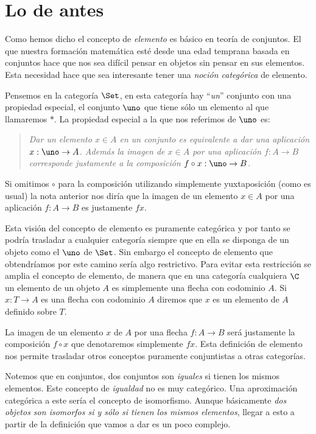 \section{Lo de antes}
Como hemos dicho el concepto de \emph{elemento} es básico en teoría de conjuntos. El que nuestra formación matemática esté desde una edad temprana basada en conjuntos hace que nos sea difícil pensar en objetos sin pensar en sus elementos. Esta necesidad hace que sea interesante tener una \emph{noción categórica} de elemento.

Pensemos en la categoría $\Set$, en esta categoría hay ``\emph{un}'' conjunto con una propiedad especial, el conjunto $\uno$  que tiene sólo un elemento al que llamaremos $*$. La propiedad especial a la que nos referimos de $\uno$ es:
\begin{quotation}
	\emph{Dar un elemento $x\in A$ en un conjunto es equivalente a dar una aplicación $x:\uno\rightarrow A$. Además la imagen de $x\in A$ por una aplicación $f:A\rightarrow B$ corresponde justamente a la composición $f\circ x:\uno \rightarrow B$.}
\end{quotation}

Si omitimos $\circ$ para la composición utilizando simplemente yuxtaposición (como es usual) la nota anterior nos diría que la imagen de un elemento $x\in A$ por una aplicación $f:A\rightarrow B$ es justamente $fx$.

Esta visión del concepto de elemento es puramente categórica y por tanto se podría trasladar a cualquier categoría siempre que en ella se disponga de un objeto como el $\uno$ de $\Set$. Sin embargo el concepto de elemento que obtendríamos por este camino sería algo restrictivo. Para evitar esta restricción se amplia el concepto de elemento, de manera que en una categoría cualquiera $\C$ un elemento de un objeto $A$ es simplemente una flecha con codominio $A$. Si $x:T\rightarrow A$ es una flecha con codominio $A$ diremos que $x$ es un elemento de $A$ definido sobre $T$.

La imagen de un elemento $x$ de $A$ por una flecha $f:A\rightarrow B$ será justamente la composición $f\circ x$ que denotaremos simplemente $fx$. Esta definición de elemento nos permite trasladar otros conceptos puramente conjuntistas a otras categorías.

Notemos que en conjuntos, dos conjuntos son \emph{iguales} si tienen los mismos elementos. Este concepto de \emph{igualdad} no es muy categórico. Una aproximación categórica a este sería el concepto de isomorfismo. Aunque básicamente \emph{dos objetos son isomorfos si y sólo si tienen los mismos elementos}, llegar a esto a partir de la definición que vamos a dar es un poco complejo.

